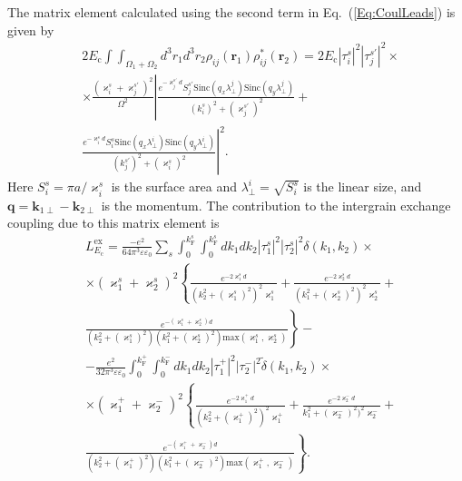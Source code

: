 \documentclass[aps,prb,amsmath,amssymb,twocolumn,superscriptaddress,showpacs,floatfix]{revtex4-1}
\begin{document}
The matrix element calculated using the second term in Eq.~(\ref{Eq:CoulLeads}) is given by
\begin{equation}\label{Eq:MatElCoulEc}
\begin{split}
&2E_\mathrm c\int\int_{\Omega_1+\Omega_2} d^3r_1 d^3r_2 \rho_{ij}(\mathbf r_1)\rho_{ij}^*(\mathbf r_2)=2E_\mathrm c|\tau^s_i|^2|\tau^{s'}_j|^2\times\\
&\times\frac{(\varkappa^s_i+\varkappa^{s'}_j)^2}{\Omega^2}\left|\frac{e^{-\varkappa^{s'}_jd}S^{s'}_j\mathrm{Sinc}(q_x\lambda_\perp^j)\mathrm{Sinc}(q_y\lambda_\perp^j)}{(k^s_i)^2+(\varkappa_j^{s'})^2}\right.+\\
&\left.\frac{e^{-\varkappa^{s}_id}S^s_i\mathrm{Sinc}(q_x\lambda_\perp^i)\mathrm{Sinc}(q_y\lambda_\perp^i)}{(k^{s'}_j)^2+(\varkappa_i^{s})^2}\right|^2.
\end{split}
\end{equation}
Here $S^s_i=\pi a/\varkappa^s_i$ is the surface area and
$\lambda_\perp^i=\sqrt{S^s_i}$ is the linear size, and
$\mathbf q=\mathbf k_{1\perp}-\mathbf k_{2\perp}$ is the momentum.
The contribution to the intergrain exchange coupling due to this matrix element is
\begin{equation}\label{Eq:ExchContrCoulEc}
\begin{split}
&L^\mathrm{ex}_{E_\mathrm c}=\frac{-e^2}{64\pi^3\varepsilon\varepsilon_0}\sum_s\!\int_0^{k^s_\mathrm F}\!\!\int_0^{k^s_\mathrm F}\! dk_1dk_2 |\tau^s_1|^2|\tau^{s}_2|^2\delta(k_1,k_2)\times\\
&\times(\varkappa^s_1+\varkappa^{s}_2)^2\left\{\frac{e^{-2\varkappa^{s}_1d}}{(k_2^2+(\varkappa_1^{s})^2)^2\varkappa_1^{s}}+\frac{e^{-2\varkappa^{s}_2d}}{(k_1^2+(\varkappa_2^{s})^2)^2\varkappa_2^{s}}+\right.\\
&\left.\frac{e^{-(\varkappa^{s}_1+\varkappa^{s}_2)d}}{(k_2^2+(\varkappa_1^{s})^2)(k_1^2+(\varkappa_2^{s})^2)\mathrm{max}(\varkappa_1^{s},\varkappa_2^{s})}\right\}-\\
&-\frac{e^2}{32\pi^3\varepsilon\varepsilon_0}\!\int_0^{k^+_\mathrm F}\!\!\int_0^{k^-_\mathrm F}\! dk_1dk_2 |\tau^+_1|^2|\tau^{-}_2|^2\tilde\delta(k_1,k_2)\times\\
&\times(\varkappa^+_1+\varkappa^{-}_2)^2\left\{\frac{e^{-2\varkappa^{+}_1d}}{(k_2^2+(\varkappa_1^{+})^2)^2\varkappa_1^{+}}+\frac{e^{-2\varkappa^{-}_2d}}{k_1^2+(\varkappa_2^{-})^2)^2\varkappa_2^{-}}+\right.\\
&\left.\frac{e^{-(\varkappa^{+}_1+\varkappa^{-}_2)d}}{(k_2^2+(\varkappa_1^{+})^2)(k_1^2+(\varkappa_2^{-})^2)\mathrm{max}(\varkappa_1^{+},\varkappa_2^{-})}\right\}.
\end{split}
\end{equation}
\end{document}
